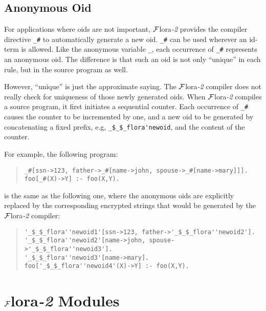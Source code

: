 \documentclass[11pt]{article}
\newcommand{\FLORA}{{\mbox{${\cal F}${\sc lora}\rm\emph{-2}}}\xspace}
\begin{document}
\subsection{Anonymous Oid}


%
For applications where oids are not important, \FLORA provides the
compiler directive \verb|_#| to automatically generate a new
oid. \verb|_#| can be used wherever an id-term is allowed. Like the
anonymous variable \verb|_|, each occurrence of \verb|_#| represents
an anonymous oid. The difference is that such an oid is not only
``unique'' in each rule, but in the source program as well.

However, ``unique'' is just the approximate saying. The \FLORA
compiler does not really check for uniqueness of those newly generated
oids.  When \FLORA compiles a source program, it first initiates a
sequential counter.  Each occurrence of \verb|_#| causes the counter
to be incremented by one, and a new oid to be generated by
concatenating a fixed prefix, e.g, \verb|_$_$_flora'newoid|, and the
content of the counter.

For example, the following program:
\begin{quote}
\begin{verbatim}
_#[ssn->123, father->_#[name->john, spouse->_#[name->mary]]].
foo[_#(X)->Y] :- foo(X,Y).
\end{verbatim}
\end{quote}
is the same as the following one, where the anonymous oids are explicitly
replaced by the corresponding encrypted strings that would be generated
by the \FLORA compiler:
\begin{quote}
\begin{verbatim}
'_$_$_flora''newoid1'[ssn->123, father->'_$_$_flora''newoid2'].
'_$_$_flora''newoid2'[name->john, spouse->'_$_$_flora''newoid3'].
'_$_$_flora''newoid3'[name->mary].
foo['_$_$_flora''newoid4'(X)->Y] :- foo(X,Y).
\end{verbatim}
\end{quote}


\section{\FLORA Modules} \label{sec:flora-modules}
\end{document}
